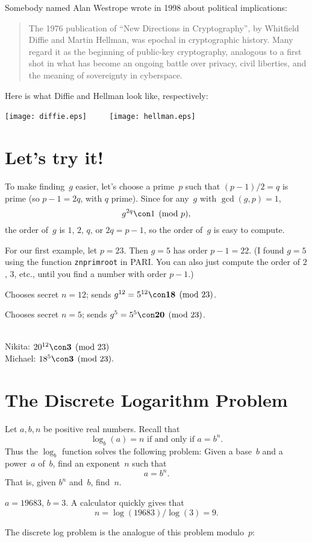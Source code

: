 \documentclass[11pt]{report}
\begin{document}
Somebody named Alan Westrope wrote in 1998 about political
implications:
\begin{quote}
  The 1976 publication of ``New Directions in Cryptography'', by
  Whitfield Diffie and Martin Hellman, was epochal in cryptographic
  history. Many regard it as the beginning of public-key cryptography,
  analogous to a first shot in what has become an ongoing battle over
  privacy, civil liberties, and the meaning of sovereignty in cyberspace.
\end{quote}

Here is what Diffie and Hellman look like, respectively:
\begin{center}
  \texttt{[image: diffie.eps]}
  $\qquad$
  \texttt{[image: hellman.eps]}
\end{center}

\section{Let's try it!}
To make finding~$g$ easier, let's choose a prime~$p$
such that $(p-1)/2=q$ is prime (so $p-1 = 2q$, with $q$ prime).
Since for any~$g$ with $\gcd(g,p)=1$,
$$
  g^{2q} \con 1\pmod{p},
$$
the order of~$g$ is $1$, $2$, $q$, or $2q=p-1$,
so the order of~$g$ is easy to compute.

For our first example, let $p=23$.
Then $g=5$ has order $p-1=22$.
(I found $g=5$ using the function {\tt znprimroot} in PARI.  You can
also just compute the order of $2$, $3$, etc., until you find a number
with order $p-1$.)

 Chooses secret $n=12$; sends $g^{12} = 5^{12} \con \mathbf{18}
  \pmod{23}$.

 Chooses secret $n=5$; sends $g^5 = 5^5 \con \mathbf{20}
  \pmod{23}$.

\\
Nikita:
$
  20^{12} \con \mathbf{3}\pmod{23}
$\\
Michael:
$
  18^{5} \con \mathbf{3}\pmod{23}.
$

\section{The Discrete Logarithm Problem}

Let $a, b, n$ be positive real numbers.
Recall that
$$
  \log_b(a) = n \text{ if and only if } a=b^n.
$$
Thus the $\log_b$ function solves the following problem:
Given a base~$b$ and a power~$a$ of~$b$,
find an exponent~$n$ such that
$$
  a = b^n.
$$
That is, given $b^n$ and~$b$, find~$n$.
\begin{example}
  $a = 19683$, $b=3$.
  A calculator quickly gives that
  $$
    n = \log(19683) / \log(3) = 9.
  $$
\end{example}
The discrete log problem is the analogue of this problem modulo~$p$:
\end{document}
